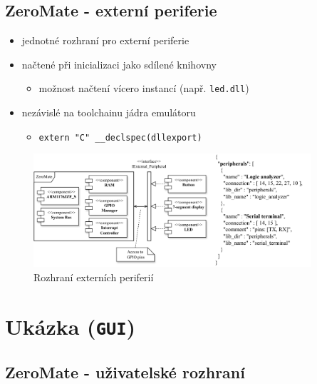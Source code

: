 \documentclass[compress]{beamer}
\begin{document}
\subsection{ZeroMate - externí periferie}

\begin{frame}
	
	\begin{itemize}
		\item jednotné rozhraní pro externí periferie
		\item načtené při inicializaci jako sdílené knihovny
		\begin{itemize}
			\item možnost načtení vícero instancí (např. \texttt{led.dll})
		\end{itemize}
		\item nezávislé na toolchainu jádra emulátoru
		\begin{itemize}
			\item \texttt{extern "C" \_\_declspec(dllexport)}
		\end{itemize}
	\end{itemize}
	\vspace{-0.4cm}
	\begin{figure}
		\centering
		\hspace{0.4cm}
		\vspace{-0.4cm}
		\includegraphics[width=0.92\textwidth]{img/peripheral_interface_2.pdf}
		\caption{Rozhraní externích periferií}
	\end{figure}
\end{frame}

\section{Ukázka (\texttt{GUI})}

\subsection{ZeroMate - uživatelské rozhraní}
\end{document}
